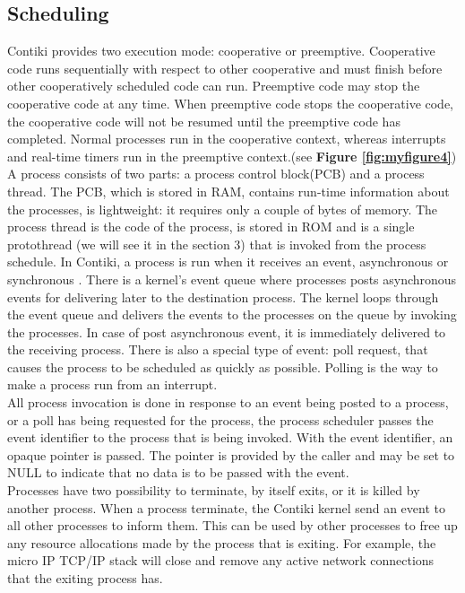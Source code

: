 \documentclass[a4paper,10pt]{article}
\begin{document}
\begin{multicols}{2}
\subsection{Scheduling}

Contiki provides two execution mode: cooperative or preemptive. Cooperative code runs sequentially with respect to other cooperative and must finish before other cooperatively scheduled code can run. Preemptive code may stop the cooperative code at any time. When preemptive code stops the cooperative code, the cooperative code will not be resumed until the preemptive code has completed.
Normal processes run in the cooperative context, whereas interrupts and real-time timers run in the preemptive context.(see {\bf Figure \ref{fig:myfigure4}})\\
A process consists of two parts: a process control block(PCB) and a process thread. The PCB, which is stored in RAM, contains run-time information about the processes, is lightweight: it requires only a couple of bytes of memory. The process thread is the code of the process, is stored in ROM and is a single protothread (we will see it in the section 3) that is invoked from the process schedule. 
In Contiki, a process is run when it receives an event, asynchronous or synchronous . There is a kernel's event queue where processes posts asynchronous events for delivering later to the destination process. The kernel loops through the event queue and delivers the events to the processes on the queue by invoking the processes. In case of post asynchronous event, it is immediately delivered to the receiving process.
There is also a special type of event: poll request, that causes the process to be scheduled as quickly as possible.
Polling is the way to make a process run from an interrupt.\\ 
 All process invocation is done in response to an event being posted to a process, or a poll has being requested for the process, the process scheduler passes the event identifier to the process that is being invoked. With the event identifier, an opaque pointer is passed. The pointer is provided by the caller and may be set to NULL to indicate that no data is to be passed with the event.\\
Processes have two possibility to terminate, by itself exits, or it is killed by another process.
When a process terminate, the Contiki kernel send an event to all other processes to inform them. This can be used by other processes to free up any resource allocations made by the process that is exiting. For example, the micro IP TCP/IP stack will close and remove any active network connections that the exiting process has.



\end{multicols}
\end{document}
